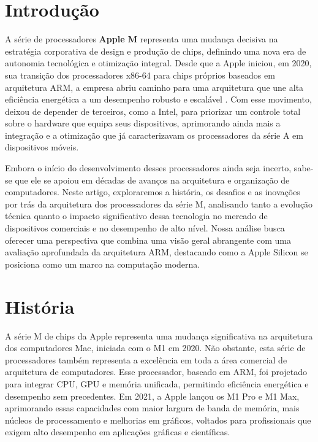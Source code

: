 \documentclass[a4paper,times,12pt]{article}
\begin{document}
\section{Introdução}
\hspace*{+15pt} 
A série de processadores \textbf{Apple M} representa uma mudança decisiva na estratégia corporativa de design e produção de chips, definindo uma nova era de autonomia tecnológica e otimização integral. Desde que a Apple iniciou, em 2020, sua transição dos processadores x86-64 para chips próprios baseados em arquitetura ARM, a empresa abriu caminho para uma arquitetura que une alta eficiência energética a um desempenho robusto e escalável \cite{apple_silicon_overview}. Com esse movimento, deixou de depender de terceiros, como a Intel, para priorizar um controle total sobre o hardware que equipa seus dispositivos, aprimorando ainda mais a integração e a otimização que já caracterizavam os processadores da série A em dispositivos móveis.

Embora o início do desenvolvimento desses processadores ainda seja incerto, sabe-se que ele se apoiou em décadas de avanços na arquitetura e organização de computadores. Neste artigo, exploraremos a história, os desafios e as inovações por trás da arquitetura dos processadores da série M, analisando tanto a evolução técnica quanto o impacto significativo dessa tecnologia no mercado de dispositivos comerciais e no desempenho de alto nível. Nossa análise busca oferecer uma perspectiva que combina uma visão geral abrangente com uma avaliação aprofundada da arquitetura ARM, destacando como a Apple Silicon se posiciona como um marco na computação moderna.

\section{História}
\hspace{+15pt} 
A série M de chips da Apple representa uma mudança significativa na arquitetura dos computadores Mac, iniciada com o M1 em 2020. Não obstante, esta série de processadores também representa a excelência em toda a área comercial de arquitetura de computadores. Esse processador, baseado em ARM, foi projetado para integrar CPU, GPU e memória unificada, permitindo eficiência energética e desempenho sem precedentes. Em 2021, a Apple lançou os M1 Pro e M1 Max, aprimorando essas capacidades com maior largura de banda de memória, mais núcleos de processamento e melhorias em gráficos, voltados para profissionais que exigem alto desempenho em aplicações gráficas e científicas.
\end{document}
